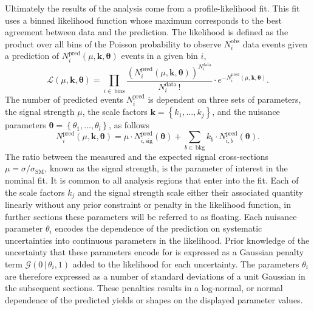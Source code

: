 Ultimately the results of the analysis come from a profile-likelihood fit. This
fit uses a binned likelihood function whose maximum corresponds to the best
agreement between data and the prediction. The likelihood is defined as the
product over all bins of the Poisson probability to observe $N^{\text{obs}}_i$ data
events given a prediction of $N^{\text{pred}}_i(\mu,\bm{k},{\bm\theta})$
events in a given bin $i$,
\begin{equation}
  \mathcal{L}(\mu,{\bm{k},\bm{\theta}}) =
  \prod_{i\in\,\text{bins}} \frac{\left( N_{i}^{\text{pred}}(\mu,{\bm{k,\theta}})
    \right)^{N_{i}^{\text{data}}}}{N_{i}^{\text{data}}\,!}
  \cdot e^{-N_{i}^{\text{pred}}(\mu,{\bm{k,\theta}})}.
  \label{eq:likelihood}
\end{equation}
The number of predicted events $N^{\text{pred}}_i$  is dependent on three sets of
parameters, the signal strength $\mu$, the scale factors $\bm{k}=\left\{k_1,
  ...,k_j\right\}$, and the nuisance parameters  $\bm{\theta} =
\left\{\theta_1,...,\theta_l\right\}$, as follows
\begin{equation}
  N_{i}^{\text{pred}}(\mu,\bm{k},\bm{\theta}) =
  \mu \cdot N_{i,\text{sig}}^{\text{pred}}(\bm{\theta}) +
  \sum_{b\in\,\text{bkg}} k_b\cdot N_{i,b}^{\text{pred}}(\bm{\theta}).
\end{equation}
The ratio between the measured and the expected signal cross-sections
$\mu=\sigma/\sigma_{\text{SM}}$, known as the signal strength, is the parameter
of interest in the nominal fit. It is common to all analysis regions that enter
into the fit. Each of the scale factors $k_j$ and the signal strength scale
either their associated quantity linearly without any prior constraint or
penalty in the likelihood function, in further sections these parameters will be
referred to as floating. Each nuisance parameter $\theta_i$ encodes the
dependence of the prediction on systematic uncertainties into continuous
parameters in the likelihood. Prior knowledge of the uncertainty that these
parameters encode for is expressed as a Gaussian penalty term
$\mathcal{G}(0\,|\,\theta_i,1)$ added to the likelihood for each uncertainty.
The parameters $\theta_i$ are therefore expressed as a number of standard
deviations of a unit Gaussian in the subsequent sections. These penalties
results in a log-normal, or normal dependence of the predicted yields or shapes
on the displayed parameter values.

